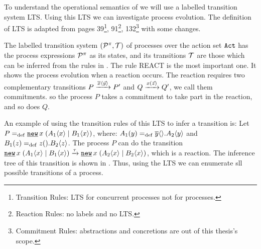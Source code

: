 To understand the operational semantics of \picalc{} we will use  a labelled transition system LTS. Using this LTS we can investigate \picalc{} process evolution. The definition of LTS is adapted from \cite{milner} pages 39\footnote{Transition Rules: LTS for concurrent processes not for \picalc{} processes.}, 91\footnote{Reaction Rules: no labels and no LTS.}, 132\footnote{Commitment Rules: abstractions and concretions are out of this thesis's scope.} with some changes.

\begin{definition}
\label{def_trans_system}

The labelled transition system $(\procs,\traces)$ of \picalc{} processes over the action set $\mathtt{Act}$ has the process expressions $\mathcal P^{\pi}$ as its states, and its transitions $\traces$ are those which can be inferred from the rules in .
The rule REACT is the most important one. It shows the process evolution when a reaction occurs. The reaction requires two complementary transitions $P \xrightarrow{\overline{x}\langle\vec{y}\rangle} P'$ and $Q \xrightarrow{x(\vec{z})} Q'$, we call them commitments. so the process $P$ takes a commitment to take part in the reaction, and so does $Q$.

\end{definition}


An example of using the transition rules of this LTS to infer a transition is: Let $P\define\procres{x}{(\procpar{\proccall{A_1}{x}}{\proccall{B_1}{x}})}$, where: $A_1(y)=_{\mathrm{def}}{}\overline{y}\langle{}\rangle.A_2\langle y\rangle$ and $B_1(z)=_{\mathrm{def}}{}z({}).B_2\langle z\rangle$. The process $P$ can do the transition $\procres{x}{(\procpar{\proccall{A_1}{x}}{\proccall{B_1}{x}})} \transs{\tau} \procres{x}{(\procpar{\proccall{A_2}{x}}{\proccall{B_2}{x}})}$, which is a reaction. The inference tree of this transition is shown in . Thus, using the LTS we can enumerate sll possible transitions of a \picalc{} process.



